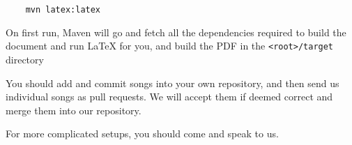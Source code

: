 \documentclass[16pt,a4paper,oneside]{book}
\newcommand{\latex}{\LaTeX\xspace}
\begin{document}
\begin{verbatim}
	mvn latex:latex
\end{verbatim}

On first run, Maven will go and fetch all the dependencies required to build the document and run \latex for you, and build the PDF in the \texttt{<root>/target} directory


You should add and commit songs into your own repository, and then send us individual songs as pull requests. We will accept them if deemed correct and merge them into our repository.

For more complicated setups, you should come and speak to us.



\end{document}

